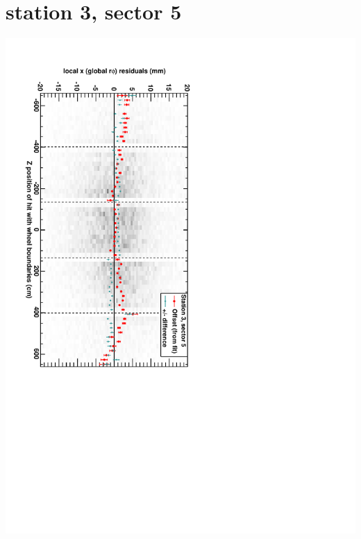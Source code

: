 \documentclass[compress]{beamer}
\begin{document}
\section*{station 3, sector 5}
\begin{frame} \vfill \mbox{\hspace{-1 cm}\includegraphics[height=1.2\linewidth, angle=90]{DTrphiVsZ_st3_sr05.pdf}} \end{frame}
\end{document}
